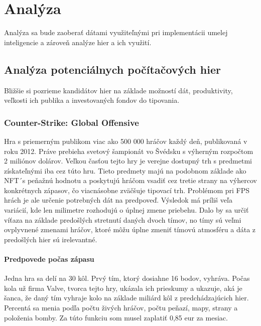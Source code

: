
\chapter{Analýza}

Analýza sa bude zaoberať dátami využiteľnými pri implementácii umelej inteligencie a zároveň analýze hier a ich využití.

\section{Analýza potenciálnych počítačových hier}
Bližšie si pozrieme kandidátov hier na základe možností dát, produktivity, veľkosti ich publika a investovaných fondov do tipovania.

\subsection{Counter-Strike: Global Offensive}
Hra s priemerným publikom viac ako 500 000 hráčov každý deň, publikovaná v roku 2012.\cite{csgoplayers} Práve prebieha svetový šampionát vo Švédsku s výherným rozpočtom 2 miliónov dolárov. Veľkou časťou tejto hry je verejne dostupný trh s predmetmi získateľnými iba cez túto hru. Tieto predmety majú na podobnom základe ako NFT´s peňažnú hodnotu a poskytujú hráčom vsadiť cez tretie strany na výhercov konkrétnych zápasov, čo viacnásobne zväčšuje tipovací trh. Problémom pri FPS hrách je ale určenie potrebných dát na predpoveď. Výsledok má príliš veľa variácií, kde len milimetre rozhodujú o úplnej zmene priebehu. Dalo by sa určiť víťaza na základe predošlých stretnutí daných dvoch tímov, no tímy sú veľmi ovplyvnené zmenami hráčov, ktoré môžu úplne zmeniť tímovú atmosféru a dáta z predošlých hier sú irelevantné.

 \subsubsection{Predpovede počas zápasu}
 Jedna hra sa delí na 30 kôl. Prvý tím, ktorý dosiahne 16 bodov, vyhráva. Počas kola už firma Valve, tvorca tejto hry, ukázala ich prieskumy a ukazuje, aká je šanca, že daný tím vyhraje kolo na základe miliárd kôl z predchádzajúcich hier. Percentá sa menia podľa počtu živých hráčov, počtu peňazí, mapy, strany a položenia bomby. Za túto funkciu som musel zaplatiť 0,85 eur za mesiac.


